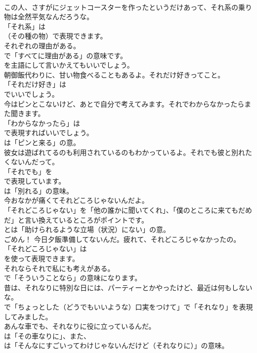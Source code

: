 \documentclass[8pt]{extreport}
\begin{document}
\begin{CJK}{UTF8}{min}
\\	この人、さすがにジェットコースターを作ったというだけあって、それ系の乗り物は全然平気なんだろうな。 
\\	「それ系」は
\\	（その種の物）で表現できます。	
\\	それぞれの理由がある。 
\\	で「すべてに理由がある」の意味です。
\\	を主語にして言いかえてもいいでしょう。	
\\	朝御飯代わりに、甘い物食べることもあるよ。それだけ好きってこと。 
\\	「それだけ好き」は
\\	でいいでしょう。	
\\	今はピンとこないけど、あとで自分で考えてみます。それでわからなかったらまた聞きます。 
\\	「わからなかったら」は
\\	で表現すればいいでしょう。
\\	は「ピンと来る」の意。	
\\	彼女は遊ばれてるのも利用されているのもわかっているよ。それでも彼と別れたくないんだって。 
\\	「それでも」を 
\\	で表現しています。
\\	は「別れる」の意味。	
\\	今おなかが痛くてそれどころじゃないんだよ。 
\\	「それどころじゃない」を「他の誰かに聞いてくれ」、「僕のところに来てもだめだ」と言い換えているところがポイントです。
\\	とは「助けられるような立場（状況）にない」の意。	
\\	ごめん！ 今日夕飯準備してないんだ。疲れて、それどころじゃなかったの。 
\\	「それどころじゃない」は
\\	を使って表現できます。	
\\	それならそれで私にも考えがある。 
\\	で「そういうことなら」の意味になります。	
\\	昔は、それなりに特別な日には、パーティーとかやったけど、最近は何もしないな。 
\\	で「ちょっとした（どうでもいいような）口実をつけて」で「それなり」を表現してみました。	
\\	あんな車でも、それなりに役に立っているんだ。 
\\	は「その車なりに」、また、
\\	は「そんなにすごいってわけじゃないんだけど（それなりに）」の意味。	

\end{CJK}
\end{document}
